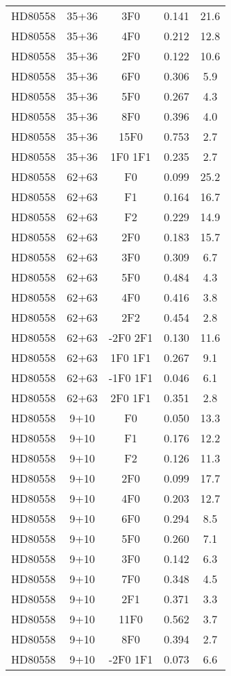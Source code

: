 \begin{table*}
\begin{tabular}{l c c c c}
HD80558 & 35+36 & 3F0 & 0.141 & 21.6\\ 
HD80558 & 35+36 & 4F0 & 0.212 & 12.8\\ 
HD80558 & 35+36 & 2F0 & 0.122 & 10.6\\ 
HD80558 & 35+36 & 6F0 & 0.306 & 5.9\\ 
HD80558 & 35+36 & 5F0 & 0.267 & 4.3\\ 
HD80558 & 35+36 & 8F0 & 0.396 & 4.0\\ 
HD80558 & 35+36 & 15F0 & 0.753 & 2.7\\ 
HD80558 & 35+36 & 1F0 1F1 & 0.235 & 2.7\\ 
\hline
HD80558 & 62+63 & F0 & 0.099 & 25.2\\ 
HD80558 & 62+63 & F1 & 0.164 & 16.7\\ 
HD80558 & 62+63 & F2 & 0.229 & 14.9\\ 
HD80558 & 62+63 & 2F0 & 0.183 & 15.7\\ 
HD80558 & 62+63 & 3F0 & 0.309 & 6.7\\ 
HD80558 & 62+63 & 5F0 & 0.484 & 4.3\\ 
HD80558 & 62+63 & 4F0 & 0.416 & 3.8\\ 
HD80558 & 62+63 & 2F2 & 0.454 & 2.8\\ 
HD80558 & 62+63 & -2F0 2F1 & 0.130 & 11.6\\ 
HD80558 & 62+63 & 1F0 1F1 & 0.267 & 9.1\\ 
HD80558 & 62+63 & -1F0 1F1 & 0.046 & 6.1\\ 
HD80558 & 62+63 & 2F0 1F1 & 0.351 & 2.8\\ 
\hline
HD80558 & 9+10 & F0 & 0.050 & 13.3\\ 
HD80558 & 9+10 & F1 & 0.176 & 12.2\\ 
HD80558 & 9+10 & F2 & 0.126 & 11.3\\ 
HD80558 & 9+10 & 2F0 & 0.099 & 17.7\\ 
HD80558 & 9+10 & 4F0 & 0.203 & 12.7\\ 
HD80558 & 9+10 & 6F0 & 0.294 & 8.5\\ 
HD80558 & 9+10 & 5F0 & 0.260 & 7.1\\ 
HD80558 & 9+10 & 3F0 & 0.142 & 6.3\\ 
HD80558 & 9+10 & 7F0 & 0.348 & 4.5\\ 
HD80558 & 9+10 & 2F1 & 0.371 & 3.3\\ 
HD80558 & 9+10 & 11F0 & 0.562 & 3.7\\ 
HD80558 & 9+10 & 8F0 & 0.394 & 2.7\\ 
HD80558 & 9+10 & -2F0 1F1 & 0.073 & 6.6\\ 
\hline
\hline
\end{tabular}
\end{table*}
